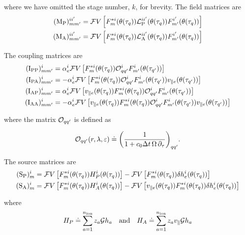 where we have omitted the stage number, $k$, for brevity. 
The field matrices are
%
\begin{align}
({{\rm M}_{\rm P}})_{mm^\prime}^{ii^\prime} & = {\cal F}V \left[ F^{*i}_m(\theta(\tau_q)) 
              {\cal L}_{\rm P}^{ii^\prime}(\theta(\tau_q)) F^{i^\prime}_{m^\prime}(\theta(\tau_q)) \right] \\
({\rm M}_{\rm A})_{mm^\prime}^{ii^\prime} & = {\cal F}V \left[ F^{*i}_m(\theta(\tau_q))  
              {\cal L}_{\rm A}^{ii^\prime}(\theta(\tau_q)) F^{i^\prime}_{m^\prime}(\theta(\tau_q)) \right] 
\end{align}

The coupling matrices are
%
\begin{align}
({\rm I}_{\rm PP})_{mm^\prime}^i & = \alpha_e^i {\cal F}V \left[
  F_m^{*i}(\theta(\tau_q)) {\cal O}_{q q^\prime}^i F_{m^\prime}^i(\theta(\tau_{q^\prime})) \right] \\
({\rm I}_{\rm PA})_{mm^\prime}^i & = - \alpha_e^i {\cal F}V \left[
  F_m^{*i}(\theta(\tau_q)) {\cal O}_{q q^\prime}^i F_{m^\prime}^i(\theta(\tau_{q^\prime})) v_{\parallel e}(\theta(\tau_{q^\prime})) \right] \\
({\rm I}_{\rm AP})_{mm^\prime}^i & =  \alpha_e^i {\cal F}V \left[
  v_{\parallel e}(\theta(\tau_q)) F_m^{*i}(\theta(\tau_q)) {\cal O}_{q q^\prime}^i F_{m^\prime}^i(\theta(\tau_{q^\prime})) \right] \\
({\rm I}_{\rm AA})_{mm^\prime}^i & = - \alpha_e^i {\cal F}V \left[
  v_{\parallel e}(\theta(\tau_q)) F_m^{*i}(\theta(\tau_q)) {\cal O}_{q q^\prime}^i F_{m^\prime}^i(\theta(\tau_{q^\prime}))v_{\parallel e}(\theta(\tau_{q^\prime})) \right]
\end{align}

where the matrix ${\cal O}_{q q^\prime}$ is defined as

\begin{equation}
{\cal O}_{q q^\prime} (r,\lambda,{\varepsilon}) \doteq
{\left( \frac{1}{1+c_0 {\Delta t}\, \Omega \, \partial_\tau} \right)}_{q q^\prime} .
\end{equation}

The source matrices are 
%
\begin{align}
({\rm S}_{\rm P})_m^i & = {\cal F}V\left[ F_m^{*i}(\theta(\tau_q)) H_P^i(\theta(\tau_q)) \right] - 
        {\cal F}V \left[ F_m^{*i}(\theta(\tau_q)) \delta h_e^i(\theta(\tau_q)) \right] 
\label{imex.sp}\\
({\rm S}_{\rm A})_m^i & = {\cal F}V\left[ F_m^{*i}(\theta(\tau_q)) H_A^i(\theta(\tau_q)) \right] - 
        {\cal F}V \left[ v_{\parallel e}(\theta(\tau_q)) F_m^{*i}(\theta(\tau_q)) \delta h_e^i(\theta(\tau_q)) \right]
\label{imex.sa}
\end{align}

where 
%
\begin{equation}
H_P \doteq \sum_{a=1}^{n_{\rm ion}} z_a {\cal G} h_a 
\quad\mbox{and}\quad
H_A \doteq \sum_{a=1}^{n_{\rm ion}} z_a v_\parallel {\cal G} h_a
\end{equation}

